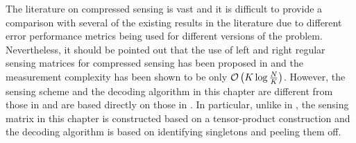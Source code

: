 The literature on compressed sensing is vast and it is difficult to provide a comparison with several of the existing results in the literature due to different error performance metrics being used for different versions of the problem. Nevertheless, it should be pointed out that the use of left and right regular sensing matrices for compressed sensing has been proposed in \cite{jafarpour2009efficient} and the measurement complexity has been shown to be only $\mathcal{O}\left(K \log \frac{N}{K} \right)$. However, the sensing scheme and the decoding algorithm in this chapter are different from those in \cite{jafarpour2009efficient} and are based directly on those in \cite{li2015subisit,li2015subdraft}. In particular, unlike in \cite{jafarpour2009efficient}, the sensing matrix in this chapter is constructed based on a tensor-product construction and the decoding algorithm is based on identifying singletons and peeling them off.

